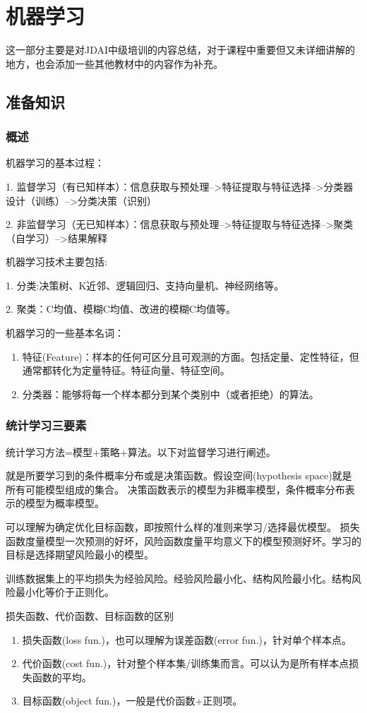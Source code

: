 \chapter{机器学习}
这一部分主要是对JDAI中级培训的内容总结，对于课程中重要但又未详细讲解的地方，也会添加一些其他教材中的内容作为补充。

\section{准备知识}
\subsection{概述}
机器学习的基本过程：

1. 监督学习（有已知样本）：信息获取与预处理-->特征提取与特征选择-->分类器设计（训练）-->分类决策（识别）

2. 非监督学习（无已知样本）：信息获取与预处理-->特征提取与特征选择-->聚类（自学习）-->结果解释

机器学习技术主要包括:

1. 分类:决策树、K近邻、逻辑回归、支持向量机、神经网络等。

2. 聚类：C均值、模糊C均值、改进的模糊C均值等。

机器学习的一些基本名词：
\begin{enumerate}
\item 特征(Feature)：样本的任何可区分且可观测的方面。包括定量、定性特征，但通常都转化为定量特征。特征向量、特征空间。
\item 分类器：能够将每一个样本都分到某个类别中（或者拒绝）的算法。
\end{enumerate}

\subsection{统计学习三要素}
统计学习方法=模型+策略+算法。以下对监督学习进行阐述。

{}就是所要学习到的条件概率分布或是决策函数。假设空间(hypothesis space)就是所有可能模型组成的集合。
决策函数表示的模型为非概率模型，条件概率分布表示的模型为概率模型。

{}可以理解为确定优化目标函数，即按照什么样的准则来学习/选择最优模型。
损失函数度量模型一次预测的好坏，风险函数度量平均意义下的模型预测好坏。学习的目标是选择期望风险最小的模型。

训练数据集上的平均损失为经验风险。经验风险最小化、结构风险最小化。结构风险最小化等价于正则化。

{\color{red} 损失函数、代价函数、目标函数的区别}
\begin{enumerate}
\item 损失函数(loss fun.)，也可以理解为误差函数(error fun.)，针对单个样本点。
\item 代价函数(cost fun.)，针对整个样本集/训练集而言。可以认为是所有样本点损失函数的平均。
\item 目标函数(object fun.)，一般是代价函数+正则项。    
\end{enumerate}

